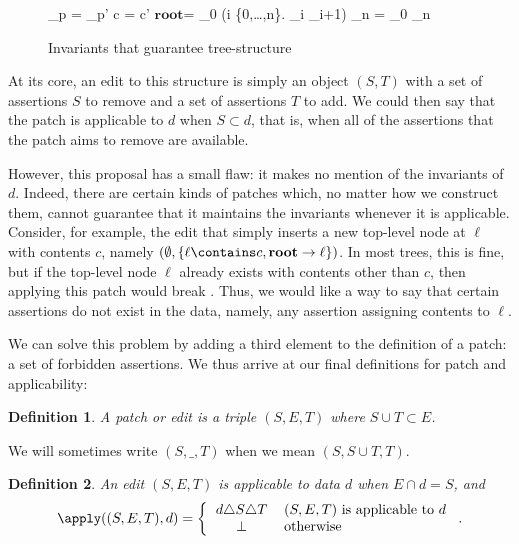 \documentclass{article}
\newtheorem{definition}{Definition}
\newcommand{\mbf}[1]{\ensuremath{\mathbf{#1}}}
\newcommand{\undefined}{\ensuremath{\bot}\xspace}
\newcommand{\symdiff}{\triangle}
\renewcommand{\root}{\mbf{root}\xspace}
\begin{document}
\begin{figure}
        {\ell_p = \ell_p'}
    \vspace{2ex}
        {c = c'}
    \vspace{2ex}
    \infrule[Full1]{}{\root \contains c}
    \vspace{2ex}
    \vspace{2ex}
        {\root = \ell_0 \land (\forall i \in
        \{0,\ldots,n\}. \ell_i \to
        \ell_{i+1}) \land \ell_n = \ell}
    \vspace{2ex}
        {\ell_0 \ne \ell_n}
    \caption{Invariants that guarantee tree-structure}
    \label{fig:well formed tree}
\end{figure}

At its core, an edit to this structure is simply an object $(S,T)$ with
a set of assertions $S$ to remove and a set of assertions $T$ to add. We
could then say that the patch is applicable to $d$ when $S \subset d$, that
is, when all of the assertions that the patch aims to remove are available.

However, this proposal has a small flaw: it makes no mention of the
invariants of $d$. Indeed, there are certain kinds of patches which, no
matter how we construct them, cannot guarantee that it maintains the
invariants whenever it is applicable. Consider, for example, the edit that
simply inserts a new top-level node at $\ell$ with contents $c$, namely
$(\emptyset,\{\ell \contains c,\root \to \ell\})$. In most trees, this is
fine, but if the top-level node $\ell$ already exists with contents other
than $c$, then applying this patch would break . Thus, we would
like a way to say that certain assertions do not exist in the data, namely,
any assertion assigning contents to $\ell$.

We can solve this problem by adding a third element to the definition of a
patch: a set of forbidden assertions. We thus arrive at our final
definitions for patch and applicability:

\begin{definition}
    A \emph{patch} or \emph{edit} is a triple $(S,E,T)$ where $S \cup T
    \subset E$.
\end{definition}
We will sometimes write $(S,\_,T)$ when we mean $(S,S \cup T,T)$.
\begin{definition}
    An edit $(S,E,T)$ is \emph{applicable} to data $d$ when $E \cap d = S$,
    and
    \[\apply((S,E,T),d) = \left\{\begin{tabular}{cl}
        $d \symdiff S \symdiff T$   & $(S,E,T)$ is applicable to $d$ \\
        \undefined                  & otherwise
    \end{tabular}\right..\]
\end{definition}
\end{document}
